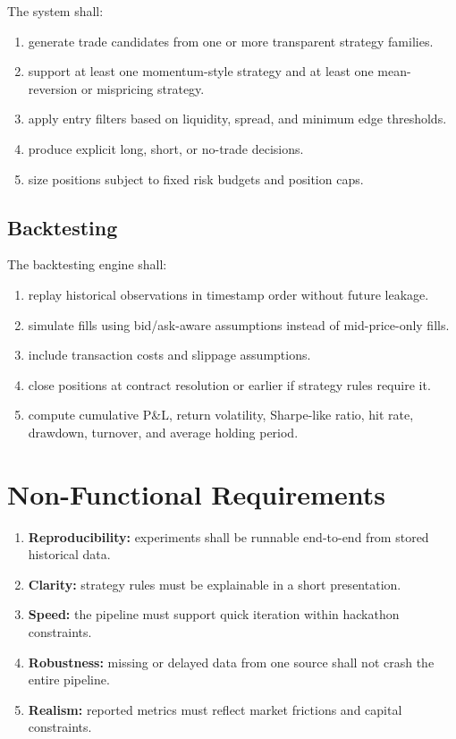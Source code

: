 \documentclass[11pt, letterpaper]{article}
\begin{document}
The system shall:

\begin{enumerate}[label=FR-\arabic*, resume, nosep]
    \item generate trade candidates from one or more transparent strategy families.
    \item support at least one momentum-style strategy and at least one mean-reversion or mispricing strategy.
    \item apply entry filters based on liquidity, spread, and minimum edge thresholds.
    \item produce explicit long, short, or no-trade decisions.
    \item size positions subject to fixed risk budgets and position caps.
\end{enumerate}

\subsection{Backtesting}

The backtesting engine shall:

\begin{enumerate}[label=FR-\arabic*, resume, nosep]
    \item replay historical observations in timestamp order without future leakage.
    \item simulate fills using bid/ask-aware assumptions instead of mid-price-only fills.
    \item include transaction costs and slippage assumptions.
    \item close positions at contract resolution or earlier if strategy rules require it.
    \item compute cumulative P\&L, return volatility, Sharpe-like ratio, hit rate, drawdown, turnover, and average holding period.
\end{enumerate}

\section{Non-Functional Requirements}

\begin{enumerate}[label=NFR-\arabic*, nosep]
    \item \textbf{Reproducibility:} experiments shall be runnable end-to-end from stored historical data.
    \item \textbf{Clarity:} strategy rules must be explainable in a short presentation.
    \item \textbf{Speed:} the pipeline must support quick iteration within hackathon constraints.
    \item \textbf{Robustness:} missing or delayed data from one source shall not crash the entire pipeline.
    \item \textbf{Realism:} reported metrics must reflect market frictions and capital constraints.
\end{enumerate}
\end{document}
